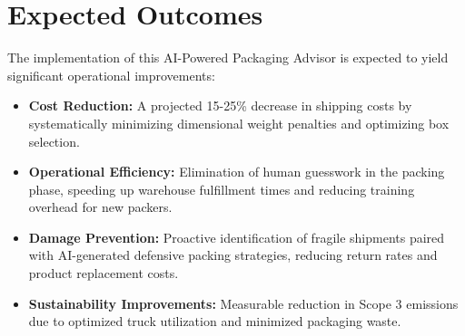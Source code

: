 \documentclass[12pt,a4paper]{article}
\begin{document}
\section{Expected Outcomes}
The implementation of this AI-Powered Packaging Advisor is expected to yield significant operational improvements:
\begin{itemize}
    \item \textbf{Cost Reduction:} A projected 15-25\% decrease in shipping costs by systematically minimizing dimensional weight penalties and optimizing box selection.
    \item \textbf{Operational Efficiency:} Elimination of human guesswork in the packing phase, speeding up warehouse fulfillment times and reducing training overhead for new packers.
    \item \textbf{Damage Prevention:} Proactive identification of fragile shipments paired with AI-generated defensive packing strategies, reducing return rates and product replacement costs.
    \item \textbf{Sustainability Improvements:} Measurable reduction in Scope 3 emissions due to optimized truck utilization and minimized packaging waste.
\end{itemize}
\end{document}
